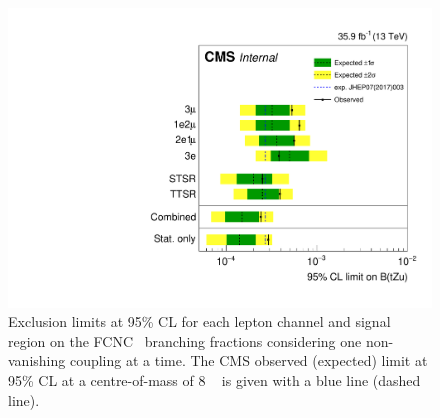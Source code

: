 \begin{figure}[htbp]
	\centering
	\includegraphics[width=1.\linewidth]{6_Search/Figures/TOP-17-017_limitsZutStat.pdf}
	\caption{Exclusion limits at 95\% CL for each lepton channel and signal region on the FCNC \Zut\ branching fractions considering one non-vanishing coupling at a time. The CMS observed (expected) limit at 95\% CL at a centre-of-mass of 8 \TeV~\cite{Sirunyan:2017kkr} is given with a blue line (dashed line).}	
	\label{fig:exclusionlimitbrcomp}
\end{figure}

